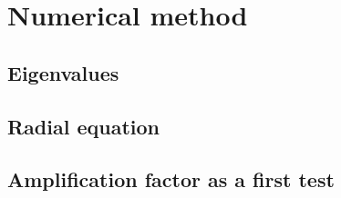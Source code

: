 
\chapter{Numerical method} %
\label{Chapter4}


\section{Eigenvalues}

\section{Radial equation}

\section{Amplification factor as a first test}


\cleardoublepage